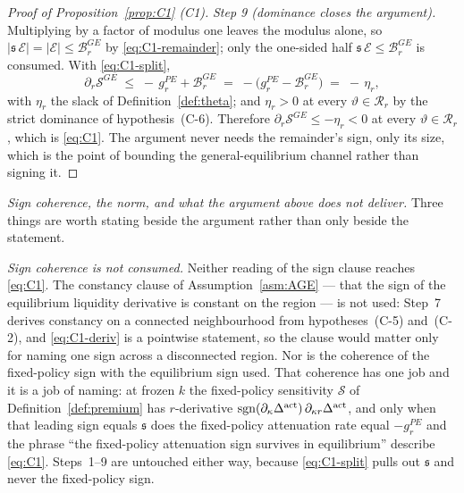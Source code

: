 \begin{proof}[Proof of Proposition~\ref{prop:C1} (C1)]
\emph{Step 9 (dominance closes the argument).} Multiplying by a factor of modulus one leaves the
modulus alone, so $\lvert \mathfrak s\,\mathcal E\rvert = \lvert\mathcal E\rvert \le
\mathcal B_r^{GE}$ by \eqref{eq:C1-remainder}; only the one-sided half
$\mathfrak s\,\mathcal E \le \mathcal B_r^{GE}$ is consumed. With \eqref{eq:C1-split},
\begin{equation}
\label{eq:C1-eta}
\partial_r\mathcal S^{GE}
\;\le\; -\,g_r^{PE} + \mathcal B_r^{GE}
\;=\; -\bigl(g_r^{PE} - \mathcal B_r^{GE}\bigr)
\;=\; -\,\eta_r ,
\end{equation}
with $\eta_r$ the slack of Definition~\ref{def:theta}; and $\eta_r > 0$ at every
$\vartheta\in\mathcal R_r$ by the strict dominance of hypothesis~(C-6). Therefore
$\partial_r\mathcal S^{GE} \le -\eta_r < 0$ at every $\vartheta\in\mathcal R_r$, which is
\eqref{eq:C1}. The argument never needs the remainder's sign, only its size, which is the point of
bounding the general-equilibrium channel rather than signing it.
\end{proof}

\medskip
\noindent\emph{Sign coherence, the norm, and what the argument above does not deliver.}
Three things are worth stating beside the argument rather than only beside the statement.

\emph{Sign coherence is not consumed.} Neither reading of the sign clause reaches \eqref{eq:C1}. The
constancy clause of Assumption~\ref{asm:AGE} --- that the sign of the equilibrium liquidity
derivative is constant on the region --- is not used: Step~7 derives constancy on a connected
neighbourhood from hypotheses~(C-5) and~(C-2), and \eqref{eq:C1-deriv} is a pointwise statement, so
the clause would matter only for naming one sign across a disconnected region. Nor is the coherence
of the fixed-policy sign with the equilibrium sign used. That coherence has one job and it is a job
of naming: at frozen $k$ the fixed-policy sensitivity $\mathcal S$ of Definition~\ref{def:premium}
has $r$-derivative $\operatorname{sgn}(\partial_\kappa\Delta^{\mathrm{act}})\,\partial_{\kappa r}\Delta^{\mathrm{act}}$, and only
when that leading sign equals $\mathfrak s$ does the fixed-policy attenuation rate equal $-g_r^{PE}$
and the phrase ``the fixed-policy attenuation sign survives in equilibrium'' describe
\eqref{eq:C1}. Steps~1--9 are untouched either way, because \eqref{eq:C1-split} pulls out
$\mathfrak s$ and never the fixed-policy sign.

